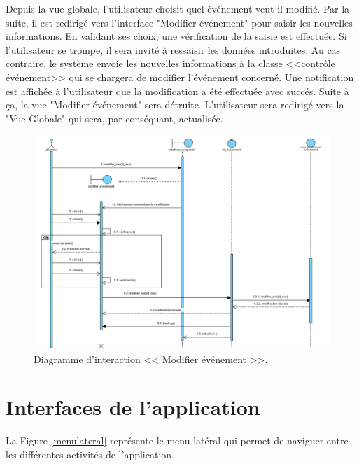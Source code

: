Depuis la vue globale, l'utilisateur choisit quel \'ev\'enement veut-il modifi\'e. Par la suite, il est redirig\'e vers l'interface "Modifier \'ev\'enement" pour saisir les nouvelles informations. En validant ses choix, une v\'erification de la saisie est effectu\'ee. Si l'utilisateur se trompe, il sera invit\'e \`a ressaisir les donn\'ees introduites. Au cas contraire, le syst\`eme envoie les nouvelles informations \`a la classe <<contr\^ole \'ev\'enement>> qui se chargera de modifier l'\'ev\'enement concern\'e. Une notification est affich\'ee \`a l'utilisateur que la modification a \'et\'e effectu\'ee avec succ\'es. Suite \`a \c{c}a, la vue "Modifier \'ev\'enement" sera d\'etruite. L'utilisateur sera redirig\'e vers la "Vue Globale" qui sera, par cons\'equant, actualis\'ee.  
\begin{landscape}
\begin{figure}[H]
	\centering
		\includegraphics[width=21cm]{images/modifier_event.PNG}
	\caption{Diagramme d'interaction << Modifier \'ev\'enement >>.}
	\label{modifierevent}
\end{figure}
\end{landscape}

\section{Interfaces de l'application}

La Figure \ref{menulateral} repr\'esente le menu lat\'eral qui permet de naviguer entre les diff\'erentes activit\'es de l'application.

